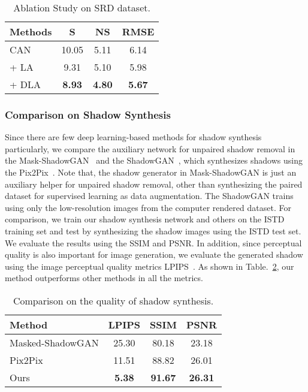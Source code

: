 \documentclass[letterpaper]{article} \usepackage{aaai20}  \usepackage{times}  \usepackage{helvet} \usepackage{courier}  \usepackage[hyphens]{url}  \urlstyle{rm} \def\UrlFont{\rm}  \usepackage{graphicx}  \frenchspacing  \setlength{\pdfpagewidth}{8.5in}  \setlength{\pdfpageheight}{11in}  \usepackage{amssymb}
\begin{document}
\begin{table}[b]
\caption{Ablation Study on SRD dataset.}
\begin{center}
\begin{tabular}{|l|c|c|c|}
\hline
Methods & S & NS & RMSE  \\
\hline
\hline
CAN & 10.05 & 5.11 & 6.14 \\
+ LA  & 9.31 & 5.10 & 5.98 \\
+ DLA & \textbf{8.93} & \textbf{4.80} & \textbf{5.67} \\
\hline
\end{tabular}
\end{center}

\label{table:eval}
\end{table}

\subsubsection{Comparison on Shadow Synthesis}
Since there are few deep learning-based methods for shadow synthesis particularly, we compare the auxiliary network for unpaired shadow removal in the Mask-ShadowGAN~\cite{Anonymous:XfCvZjhb} and the ShadowGAN~\cite{zhang2019shadowgan}, which synthesizes shadows using the Pix2Pix~\cite{isola2017image}. Note that, the shadow generator in Mask-ShadowGAN is just an auxiliary helper for unpaired shadow removal, other than synthesizing the paired dataset for supervised learning as data augmentation. The ShadowGAN trains using only the low-resolution images from the computer rendered dataset. For comparison, we train our shadow synthesis network and others on the ISTD training set and test by synthesizing the shadow images using the ISTD test set. We evaluate the results using the SSIM and PSNR. In addition, since perceptual quality is also important for image generation, we evaluate the generated shadow using the image perceptual quality metrics LPIPS~\cite{zhang2018perceptual}. As shown in Table.~\ref{tab:shadow}, our method outperforms other methods in all the metrics.

\begin{table}[t]
\caption{Comparison on the quality of shadow synthesis.}
\begin{center}
\begin{tabular}{|l|c|c|c|}
\hline
Method & LPIPS  & SSIM  & PSNR  \\
\hline
\hline
Masked-ShadowGAN & 25.30 & 80.18 & 23.18  \\
Pix2Pix & 11.51 & 88.82 & 26.01  \\
Ours & \textbf{5.38} & \textbf{91.67} & \textbf{26.31}  \\
\hline
\end{tabular}
\end{center}

\label{tab:shadow}
\end{table}
\end{document}
